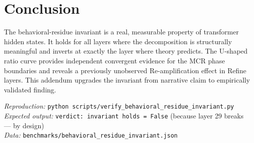 \documentclass[11pt]{article}
\begin{document}
\section{Conclusion}

The behavioral-residue invariant is a real, measurable property of transformer hidden states. It holds for all layers where the decomposition is structurally meaningful and inverts at exactly the layer where theory predicts. The U-shaped ratio curve provides independent convergent evidence for the MCR phase boundaries and reveals a previously unobserved Re-amplification effect in Refine layers. This addendum upgrades the invariant from narrative claim to empirically validated finding.

\vspace{12pt}
\noindent\textit{Reproduction:} \texttt{python scripts/verify\_behavioral\_residue\_invariant.py}\\
\textit{Expected output:} \texttt{verdict: invariant holds = False} (because layer 29 breaks --- by design)\\
\textit{Data:} \texttt{benchmarks/behavioral\_residue\_invariant.json}
\end{document}
